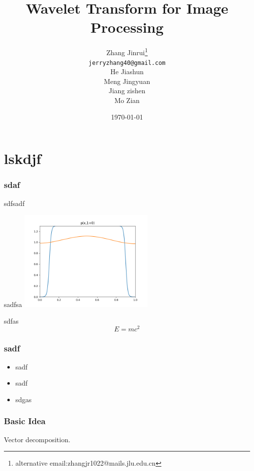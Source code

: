 \documentclass{beamer}
\title{Wavelet Transform for Image Processing}
\author{
\texorpdfstring{
Zhang Jinrui\thanks{alternative email:zhangjr1022@mails.jlu.edu.cn} \\ \texttt{jerryzhang40@gmail.com}
\\
He Jiashun
\\
Meng Jingyuan
\\
Jiang zishen
\\
Mo Zian
}
{Zhang Jinrui\thanks{alternative email:zhangjr1022@mails.jlu.edu.cn}  \texttt{jerryzhang40@gmail.com}}
}
\date{\today}
\begin{document}
\frame{\titlepage}  %

\section{lskdjf}
\begin{frame}
    \frametitle{sdaf}

    sdfsadf

    sadfsa
    \includegraphics[width=0.5\textwidth]{fig/p(x,1+0).png}
    \pause

    sdfas
    \[
        E = mc^2
    \]
\end{frame}

\begin{frame}
    \frametitle{sadf}
    \begin{itemize}[<+->]
        \item sadf
        \item sadf
        \item sdgas
    \end{itemize}
\end{frame}

\begin{frame}
    \frametitle{Basic Idea}
    Vector decomposition.
\end{frame}
\end{document}
